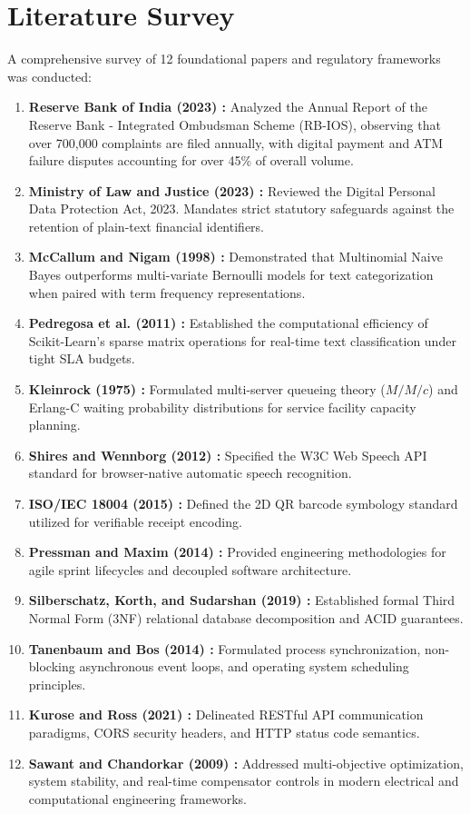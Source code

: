 \documentclass[12pt,singleside,a4paper]{article}
\begin{document}
\pagebreak

\section{Literature Survey}
A comprehensive survey of 12 foundational papers and regulatory frameworks was conducted:
\begin{enumerate}
    \item \textbf{Reserve Bank of India (2023) \cite{rbi_2023}:} Analyzed the Annual Report of the Reserve Bank - Integrated Ombudsman Scheme (RB-IOS), observing that over 700,000 complaints are filed annually, with digital payment and ATM failure disputes accounting for over 45\% of overall volume.
    \item \textbf{Ministry of Law and Justice (2023) \cite{dpdp_2023}:} Reviewed the Digital Personal Data Protection Act, 2023. Mandates strict statutory safeguards against the retention of plain-text financial identifiers.
    \item \textbf{McCallum and Nigam (1998) \cite{mccallum1998}:} Demonstrated that Multinomial Naive Bayes outperforms multi-variate Bernoulli models for text categorization when paired with term frequency representations.
    \item \textbf{Pedregosa et al. (2011) \cite{scikit_learn}:} Established the computational efficiency of Scikit-Learn's sparse matrix operations for real-time text classification under tight SLA budgets.
    \item \textbf{Kleinrock (1975) \cite{kleinrock1975}:} Formulated multi-server queueing theory ($M/M/c$) and Erlang-C waiting probability distributions for service facility capacity planning.
    \item \textbf{Shires and Wennborg (2012) \cite{w3c_speech}:} Specified the W3C Web Speech API standard for browser-native automatic speech recognition.
    \item \textbf{ISO/IEC 18004 (2015) \cite{iso_qr}:} Defined the 2D QR barcode symbology standard utilized for verifiable receipt encoding.
    \item \textbf{Pressman and Maxim (2014) \cite{pressman}:} Provided engineering methodologies for agile sprint lifecycles and decoupled software architecture.
    \item \textbf{Silberschatz, Korth, and Sudarshan (2019) \cite{silberschatz}:} Established formal Third Normal Form (3NF) relational database decomposition and ACID guarantees.
    \item \textbf{Tanenbaum and Bos (2014) \cite{tanenbaum}:} Formulated process synchronization, non-blocking asynchronous event loops, and operating system scheduling principles.
    \item \textbf{Kurose and Ross (2021) \cite{kurose}:} Delineated RESTful API communication paradigms, CORS security headers, and HTTP status code semantics.
    \item \textbf{Sawant and Chandorkar (2009) \cite{sawant2009}:} Addressed multi-objective optimization, system stability, and real-time compensator controls in modern electrical and computational engineering frameworks.
\end{enumerate}
\end{document}
